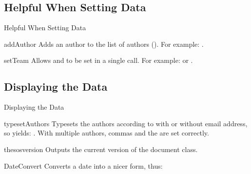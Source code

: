 \documentclass{sopra-seraphim}
\begin{document}
    \subsection{Helpful When Setting Data}
    \begin{frame}[fragile]{Helpful When Setting Data}
    \begin{command}{addAuthor}{}
        Adds an author to the list of authors (). For
        example: .
    \end{command}

    \begin{command}{setTeam}{}
        Allows  and  to be set in a single call.
        For example:  or
        .
    \end{command}
    \end{frame}


\subsection{Displaying the Data}

\begin{frame}{Displaying the Data}
    \begin{command}{typesetAuthors}{}
        Typesets the authors according to  with or
        without email address, so  yields: \typesetAuthors.
        With multiple authors, commas and the  are set correctly.
    \end{command}

    \begin{command}{thesosversion}{}
        Outputs the current version of the  document class. 
    \end{command}

    \begin{command}{DateConvert}{}
        Converts a date into a nicer form, thus:
    \begin{plainlatex}[morekeywords={[5]{\\DateConvert}}]
    \end{plainlatex}
    \end{command}
\end{frame}
\end{document}
